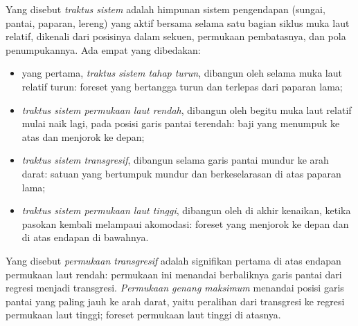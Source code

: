 \begin{definition}\label{def:b3:sequence-stratigraphy:tract}
Yang disebut \emph{traktus sistem} adalah himpunan
sistem pengendapan (sungai, pantai, paparan, lereng) yang aktif bersama selama satu
bagian siklus muka laut relatif, dikenali dari posisinya dalam
sekuen, permukaan pembatasnya, dan pola penumpukannya. Ada empat
yang dibedakan:
\begin{itemize}
\item yang pertama, \emph{traktus sistem tahap turun},
  dibangun oleh  selama muka laut relatif turun:
  foreset yang bertangga turun dan terlepas dari paparan lama;
\item \emph{traktus sistem permukaan laut rendah},
  dibangun oleh  begitu muka laut relatif mulai naik lagi,
  pada posisi garis pantai terendah: baji yang menumpuk ke atas dan menjorok ke depan;
\item \emph{traktus sistem transgresif},
  dibangun selama garis pantai mundur ke arah darat: satuan yang bertumpuk mundur
  dan berkeselarasan  di atas paparan lama;
\item \emph{traktus sistem permukaan laut tinggi},
  dibangun oleh  di akhir kenaikan, ketika pasokan kembali melampaui
  akomodasi: foreset yang menjorok ke depan dan  di atas endapan di bawahnya.
\end{itemize}
\end{definition}

\begin{definition}\label{def:b3:sequence-stratigraphy:surfaces}
Yang disebut \emph{permukaan transgresif} adalah  signifikan pertama di atas endapan permukaan laut rendah: permukaan ini menandai
berbaliknya garis pantai dari regresi menjadi transgresi. \emph{Permukaan genang
maksimum} menandai posisi garis pantai yang
paling jauh ke arah darat, yaitu peralihan dari transgresi ke regresi permukaan laut tinggi;
foreset permukaan laut tinggi  di atasnya.
\end{definition}

